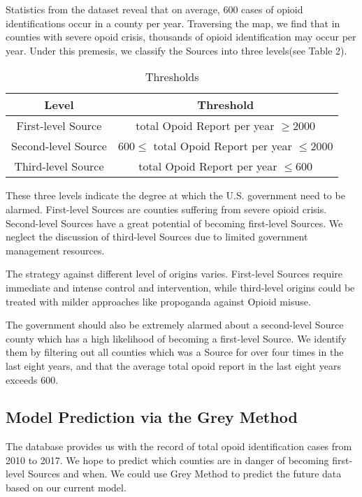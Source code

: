 Statistics from the dataset reveal that on average, 600 cases of opioid identifications occur in a county per year. Traversing the map, we find that in counties with severe opoid crisis, thousands of opioid identification may occur per year. Under this premesis, we classify the Sources into three levels(see Table 2).


\begin{table}[H]
	\centering
	\begin{tabular}{|c|c|}
		\hline
		\rowcolor[HTML]{656565} 
		{\color[HTML]{FFFFFF} \textbf{Level}} & {\color[HTML]{FFFFFF} \textbf{Threshold}} \\ \hline
		First-level Source  & total Opoid Report per year $\geq 2000$ \\ \hline
		Second-level Source & $600 \leq$ total Opoid Report per year $\leq 2000$ \\ \hline
		Third-level Source  & total Opoid Report per year $\leq 600$ \\ \hline
	\end{tabular}
	\caption{Thresholds}
\end{table}

These three levels indicate the degree at which the U.S. government need to be alarmed. First-level Sources are counties suffering from severe opioid crisis. Second-level Sources have a great potential of becoming first-level Sources. We neglect the discussion of third-level Sources due to limited government management resources.

The strategy against different level of origins varies. First-level Sources require immediate and intense control and intervention, while third-level origins could be treated with milder approaches like propoganda against Opioid misuse. 

The government should also be extremely alarmed about a second-level Source county which has a high likelihood of becoming a first-level Source. We identify them by filtering out all counties which was a Source for over four times in the last eight years, and that the average total opoid report in the last eight years exceeds 600.


\subsection{Model Prediction via the Grey Method}
The database provides us with the record of total opoid identification cases from 2010 to 2017. We hope to predict which counties are in danger of becoming first-level Sources and when. We could use Grey Method to predict the future data based on our current model.

